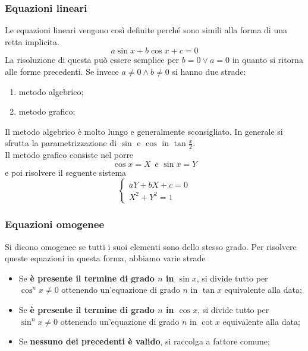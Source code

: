 \subsubsection{Equazioni lineari}
Le equazioni lineari vengono così definite perché sono simili alla forma di una retta implicita.
\begin{equation*}
  a\sin x + b\cos x + c = 0
\end{equation*}
La risoluzione di questa può essere semplice per $b = 0 \lor a = 0$ in quanto si ritorna alle forme 
precedenti. Se invece $a\neq0 \land b\neq0$ si hanno due strade:
\begin{enumerate}
  \item metodo algebrico;
  \item metodo grafico;
\end{enumerate}
Il metodo algebrico è molto lungo e generalmente sconsigliato. In generale si sfrutta la 
parametrizzazione di $\sin$ e $\cos$ in $\tan \frac{x}{2}$.\\
Il metodo grafico consiste nel porre
\begin{equation*}
  \cos x = X\,\text{ e } \sin x = Y
\end{equation*}
e poi risolvere il seguente sistema
\begin{equation*}
  \begin{cases}
    aY + bX + c = 0\\
    X^2 + Y^2 = 1
  \end{cases}
\end{equation*}

\subsubsection{Equazioni omogenee}
Si dicono omogenee se tutti i suoi elementi sono dello stesso grado. Per risolvere queste equazioni
in questa forma, abbiamo varie strade
\begin{itemize}
  \item Se \textbf{è presente il termine di grado $n$ in $\sin x$}, si divide tutto per 
    $\cos^nx\neq0$ ottenendo un'equazione di grado $n$ in $\tan x$ equivalente alla data;
  \item Se \textbf{è presente il termine di grado $n$ in $\cos x$}, si divide tutto per
    $\sin^nx\neq0$ ottenendo un'equazione di grado $n$ in $\cot x$ equivalente alla data;
  \item Se \textbf{nessuno dei precedenti è valido}, si raccolga a fattore comune;
\end{itemize}

